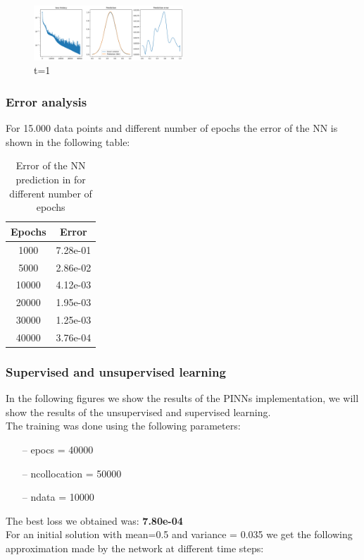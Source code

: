 \documentclass{article}
\begin{document}
\begin{figure}[!h]
    \centering
    \includegraphics[width=0.5\textwidth]{images/data5.png}
    \caption{t=1}
\end{figure} 

\newpage

\subsubsection*{Error analysis}

For 15.000 data points and different number of epochs the error of the NN is shown in the following table:

\begin{table}[!h]
    \centering
    \begin{tabular}{|c|c|}
    \hline
    \textbf{Epochs} & \textbf{Error} \\ \hline
    1000            & 7.28e-01     \\ \hline
    5000            & 2.86e-02      \\ \hline
    10000           & 4.12e-03      \\ \hline   
    20000           & 1.95e-03       \\ \hline
    30000           & 1.25e-03        \\ \hline
    40000           & 3.76e-04       \\ \hline
    \end{tabular}
    \caption{Error of the NN prediction in for different number of epochs}
    \label{tab:my-table}
\end{table}

\subsubsection{Supervised and unsupervised learning}

In the following figures we show the results of the PINNs implementation, we will show the results of the unsupervised and supervised learning.\\

The training was done using the following parameters:
\begin{itemize}
   \item[--] epocs = 40000
   \item[--] ncollocation = 50000
   \item[--] ndata = 10000
\end{itemize} The best loss we obtained was: \textbf{7.80e-04} \\
For an initial solution with mean=0.5 and variance = 0.035 we get the following approximation made by the network at different time steps:\\
\end{document}
